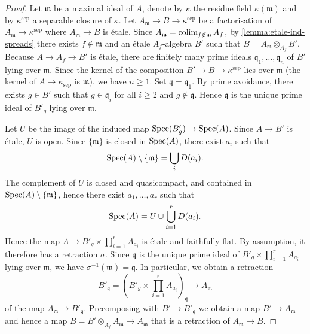\begin{proof}
    Let $\mathfrak{m}$ be a maximal ideal of $A$, denote by $\kappa$ the residue field $\kappa(\mathfrak{m})$
    and by $\kappa^{\mathrm{sep}}$ a separable closure of $\kappa$. Let
    $A_{\mathfrak{m}} \to B \to \kappa^{\mathrm{sep}}$ be a factorisation of $A_{\mathfrak{m}} \to \kappa^{\mathrm{sep}}$
    where $A_{\mathfrak{m}} \to B$ is étale. Since $A_{\mathfrak{m}} = \operatorname{colim}_{f \not\in \mathfrak{m}} A_f$,
    by \ref{lemma:etale-ind-spreads} there exists $f \not\in \mathfrak{m}$ and an étale $A_f$-algebra $B'$
    such that $B = A_{\mathfrak{m}} \otimes_{A_f} B'$.
    Because $A \to A_f \to B'$ is étale,
    there are finitely many prime ideals $\mathfrak{q}_1, \ldots, \mathfrak{q}_n$ of $B'$ lying over $\mathfrak{m}$.
    Since the kernel of the composition $B' \to B \to \kappa^{\mathrm{sep}}$ lies over $\mathfrak{m}$
    (the kernel of $A \to \kappa_{\mathrm{sep}}$ is $\mathfrak{m}$), we have $n \ge 1$.
    Set $\mathfrak{q} = \mathfrak{q}_1$. By prime avoidance, there exists $g \in B'$ such that
    $g \in \mathfrak{q}_i$ for all $i \ge 2$ and $g \not\in \mathfrak{q}$. Hence
    $\mathfrak{q}$ is the unique prime ideal of $B'_g$ lying over $\mathfrak{m}$.

    Let $U$ be the image of the induced map $\mathrm{Spec}(B'_g) \to \mathrm{Spec}(A)$. Since $A \to B'$ is étale, $U$ is open.
    Since $\{\mathfrak{m}\}$ is closed in $\mathrm{Spec}(A)$, there exist $a_i$ such that
    \[
        \mathrm{Spec}(A) \setminus \{\mathfrak{m}\} = \bigcup_{i} D(a_i)
    .\] The complement of $U$ is closed and quasicompact, and contained in $\mathrm{Spec}(A) \setminus \{\mathfrak{m}\}$, hence
    there exist $a_1, \ldots, a_r$ such that
    \[
        \mathrm{Spec}(A) = U \cup \bigcup_{i=1}^r D(a_i)
    .\] Hence the map $A \to B'_g \times \prod_{i=1}^{r} A_{a_i}$ is étale and faithfully flat. By assumption,
    it therefore has a retraction $\sigma$. Since $\mathfrak{q}$ is the unique prime ideal of $B'_g \times \prod_{i=1}^{r} A_{a_i}$
    lying over $\mathfrak{m}$, we have $\sigma^{-1}(\mathfrak{m}) = \mathfrak{q}$. In particular,
    we obtain a retraction
    \[
        B'_{\mathfrak{q}} = \left(B'_g \times \prod_{i=1}^{r} A_{a_i}\right)_{\mathfrak{q}} \to A_{\mathfrak{m}}
    \] of the map $A_{\mathfrak{m}} \to B'_{\mathfrak{q}}$. Precomposing with $B' \to B'_{\mathfrak{q}}$ we obtain
    a map $B' \to A_{\mathfrak{m}}$ and hence a map
    $B = B' \otimes_{A_f} A_{\mathfrak{m}} \to A_{\mathfrak{m}}$ that is a retraction of $A_{\mathfrak{m}} \to B$.
\end{proof}

